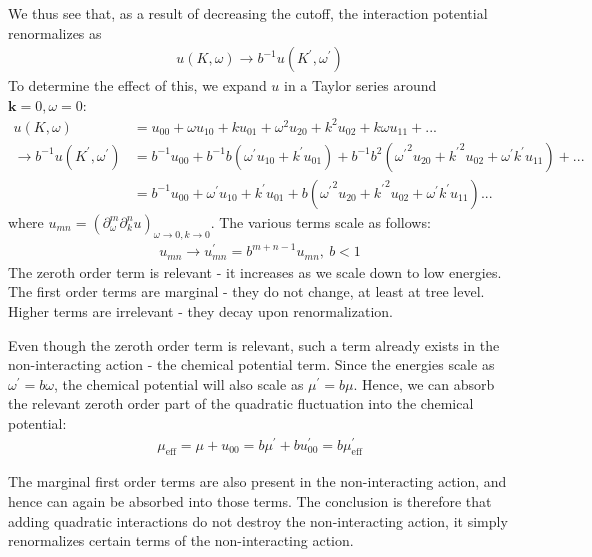 \documentclass[14pt]{extarticle}
\begin{document}
We thus see that, as a result of decreasing the cutoff, the interaction potential renormalizes as
\begin{equation}\begin{aligned}
	u(K,\omega) \to b^{-1} u(K^\prime,\omega^\prime)
\end{aligned}\end{equation}
To determine the effect of this, we expand \(u\) in a Taylor series around \(\mathbf{k}=0,\omega=0\):
\begin{equation}\begin{aligned}
	u(K,\omega) &= u_{00} + \omega u_{10} + k u_{01} + \omega^2 u_{20} + k^2 u_{02} + k\omega u_{11} + ...\\
	\to b^{-1}u(K^\prime,\omega^\prime) &= b^{-1}u_{00} + b^{-1} b\left(\omega^\prime u_{10} + k^\prime u_{01}\right) + b^{-1} b^{2} \left({\omega^\prime}^2 u_{20} + {k^\prime}^2 u_{02} + \omega^\prime k^\prime u_{11}\right) + ...\\
						   &= b^{-1}u_{00} + \omega^\prime u_{10} + k^\prime u_{01} + b \left({\omega^\prime}^2 u_{20} + {k^\prime}^2 u_{02} + \omega^\prime k^\prime u_{11}\right)...
\end{aligned}\end{equation}
where \(u_{mn} = \left(\partial^m_\omega \partial^n_k u\right)_{\omega \to 0, k \to 0}\). The various terms scale as follows:
\begin{equation}\begin{aligned}
	u_{mn} \to u_{mn}^\prime = b^{m + n - 1}u_{mn}, ~b<1
\end{aligned}\end{equation}
The zeroth order term is relevant - it increases as we scale down to low energies. The first order terms are marginal - they do not change, at least at tree level. Higher terms are irrelevant - they decay upon renormalization.

Even though the zeroth order term is relevant,  such a term already exists in the non-interacting action - the chemical potential term. Since the energies scale as \(\omega^\prime = b\omega\), the chemical potential will also scale as \(\mu^\prime = b \mu\). Hence, we can absorb the relevant zeroth order part of the quadratic fluctuation into the chemical potential:
\begin{gather}
	\mu_\text{eff} = \mu + u_{00} = b \mu^\prime + bu^\prime_{00} = b \mu_\text{eff}^\prime
\end{gather}

The marginal first order terms are also present in the non-interacting action, and hence can again be absorbed into those terms. The conclusion is therefore that adding quadratic interactions do not destroy the non-interacting action, it simply renormalizes certain terms of the non-interacting action.
\end{document}
